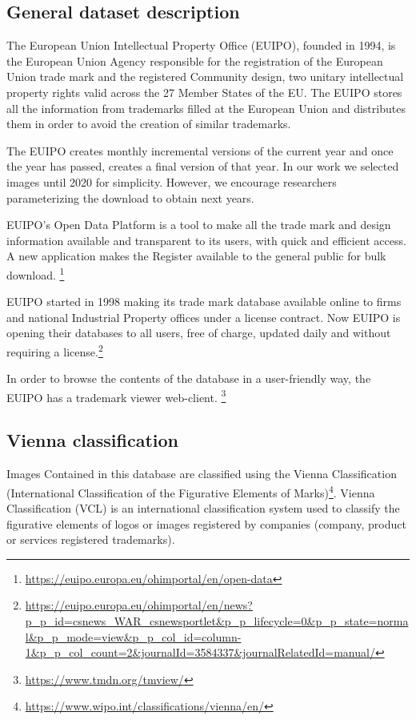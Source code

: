 \documentclass{article}
\begin{document}
\subsection{General dataset description}
The European Union Intellectual Property Office (EUIPO), founded in 1994, is the European Union Agency  responsible for the registration of the European Union trade mark and the registered Community design, two unitary intellectual property rights valid across the 27 Member States of the EU. The EUIPO stores all the information from trademarks filled at the European Union and distributes them in order to avoid the creation of similar trademarks.

The EUIPO creates monthly incremental versions of the current year and once the year has passed, creates a final version of that year. In our work we selected images until 2020 for simplicity. However, we encourage researchers parameterizing the download to obtain next years.

EUIPO’s Open Data Platform is a tool to make all the trade mark and design information available and transparent to its users, with quick and efficient access. A new application makes the Register available to the general public for bulk download.
\footnote{\url{https://euipo.europa.eu/ohimportal/en/open-data}}

EUIPO started in 1998 making its trade mark database available online to firms and national Industrial Property offices under a license contract. Now EUIPO is opening their databases to all users, free of charge, updated daily and without requiring a license.\footnote{\url{https://euipo.europa.eu/ohimportal/en/news?p_p_id=csnews_WAR_csnewsportlet&p_p_lifecycle=0&p_p_state=normal&p_p_mode=view&p_p_col_id=column-1&p_p_col_count=2&journalId=3584337&journalRelatedId=manual/}}

In order to browse the contents of the database in a user-friendly way, the EUIPO has a trademark viewer web-client. \footnote{\url{https://www.tmdn.org/tmview/}}


\subsection{Vienna classification}
Images Contained in this database are classified using the Vienna Classification (International Classification of the Figurative Elements of Marks)\footnote{\url{https://www.wipo.int/classifications/vienna/en/}}. Vienna Classification (VCL) is an international classification system used to classify the figurative elements of logos or images registered by companies (company, product or services registered trademarks).
\end{document}
